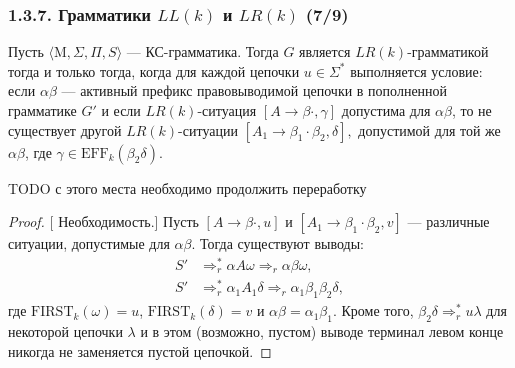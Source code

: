 \documentclass[mathserif,12pt,aspectratio=169]{beamer}
\def\proofsection#1{\par{\color{brown}\sffamily\small  [\;}{\sffamily\small\color{brown} #1}{\sffamily\small\color{brown}\;]}\;}
\def\TODO#1{{\color{gray} TODO {#1}}}
\begin{document}
\begin{frame}
\frametitle{1.3.7. Грамматики $LL(k)$ и $LR(k)$ (7/9)}
\begin{theorem}
Пусть $\langle \mathrm{M}, \Sigma, \Pi, S \rangle$ --- КС-грамматика.  
Тогда $G$ является $LR(k)$-грамматикой тогда и только тогда, когда для каждой цепочки $u \in \Sigma^*$ выполняется условие:
если $\alpha \beta$ --- активный префикс правовыводимой цепочки в пополненной грамматике $G'$ и если $LR(k)$-ситуация $[A \to \beta \cdot, \gamma]$ допустима для $\alpha \beta$,
то не существует другой $LR(k)$-ситуации 
$[A_1 \to \beta_1 \cdot \beta_2, \delta],$
допустимой для той же $\alpha \beta$, где $\gamma \in \mathrm{EFF}_k(\beta_2 \delta)$.
\end{theorem}
\TODO{с этого места необходимо продолжить переработку}
\begin{proof}
\proofsection{Необходимость.}
Пусть $[A \to \beta \cdot, u]$ и $[A_1 \to \beta_1 \cdot \beta_2, v]$ —
различные ситуации, допустимые для $\alpha \beta$.  
Тогда существуют выводы:
\[
\begin{aligned}
S' &\Rightarrow_r^* \alpha A \omega \Rightarrow_r \alpha \beta \omega,\\
S' &\Rightarrow_r^* \alpha_1 A_1 \delta \Rightarrow_r \alpha_1 \beta_1 \beta_2 \delta,
\end{aligned}
\]
где $\mathrm{FIRST}_k(\omega)=u$, $\mathrm{FIRST}_k(\delta)=v$ и $\alpha \beta = \alpha_1 \beta_1$. Кроме того, $\beta_2 \delta \Rightarrow^*_r u \lambda$ для некоторой цепочки $\lambda$ и в этом (возможно, пустом) выводе терминал левом конце никогда не заменяется пустой цепочкой. 
\end{proof}
\end{frame}
\end{document}
